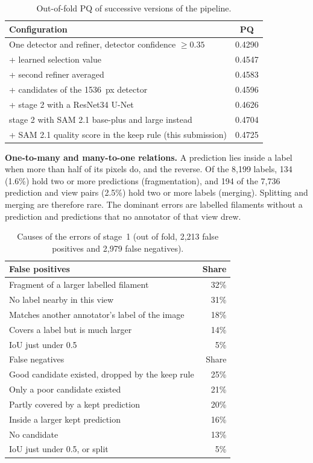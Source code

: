 \documentclass[sigconf]{acmart}
\begin{document}
\begin{table}[t]
  \caption{Out-of-fold PQ of successive versions of the pipeline.}
  \label{tab:ablation}
  \centering\small
  \begin{tabular}{lc}
    \toprule
    Configuration & PQ \\
    \midrule
    One detector and refiner, detector confidence $\geq 0.35$ & 0.4290 \\
    + learned selection value & 0.4547 \\
    + second refiner averaged & 0.4583 \\
    + candidates of the 1536~px detector & 0.4596 \\
    + stage 2 with a ResNet34 U-Net & 0.4626 \\
    stage 2 with SAM 2.1 base-plus and large instead & 0.4704 \\
    + SAM 2.1 quality score in the keep rule (this submission) & 0.4725 \\
    \bottomrule
  \end{tabular}
\end{table}

\textbf{One-to-many and many-to-one relations.} A prediction lies inside a label when more than half of its pixels do, and the reverse. Of the 8,199 labels, 134 (1.6\%) hold two or more predictions (fragmentation), and 194 of the 7,736 prediction and view pairs (2.5\%) hold two or more labels (merging). Splitting and merging are therefore rare. The dominant errors are labelled filaments without a prediction and predictions that no annotator of that view drew.

\begin{table}[t]
  \caption{Causes of the errors of stage~1 (out of fold, 2,213 false positives and 2,979 false negatives).}
  \label{tab:errors}
  \centering\small
  \begin{tabular}{lr}
    \toprule
    False positives & Share \\
    \midrule
    Fragment of a larger labelled filament & 32\% \\
    No label nearby in this view & 31\% \\
    Matches another annotator's label of the image & 18\% \\
    Covers a label but is much larger & 14\% \\
    IoU just under 0.5 & 5\% \\
    \midrule
    False negatives & Share \\
    \midrule
    Good candidate existed, dropped by the keep rule & 25\% \\
    Only a poor candidate existed & 21\% \\
    Partly covered by a kept prediction & 20\% \\
    Inside a larger kept prediction & 16\% \\
    No candidate & 13\% \\
    IoU just under 0.5, or split & 5\% \\
    \bottomrule
  \end{tabular}
\end{table}
\end{document}
